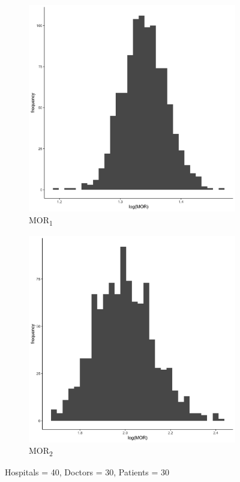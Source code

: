 \documentclass[
  letterpaper,
  DIV=11,
  numbers=noendperiod,
  titlepage]{scrartcl}
\begin{document}
\vspace{10mm}

\begin{figure}
\centering
\begin{subfigure}{.49\textwidth}
    \centering
    \includegraphics[width=.95\linewidth]{../../plots/three-lvl-ran-int/high-prev/hist_40_30_30_three_lvl_high_prev_mor1.png}  
    \caption{MOR\textsubscript{1}}
    \label{l40m30n301}
\end{subfigure}
\begin{subfigure}{.49\textwidth}
    \centering
    \includegraphics[width=.95\linewidth]{../../plots/three-lvl-ran-int/high-prev/hist_40_30_30_three_lvl_high_prev_mor2.png}
    \caption{MOR\textsubscript{2}}
    \label{l40m30n302}
\end{subfigure}
\caption{Hospitals = 40, Doctors = 30, Patients = 30}
\label{mor2}
\end{figure}
\end{document}
